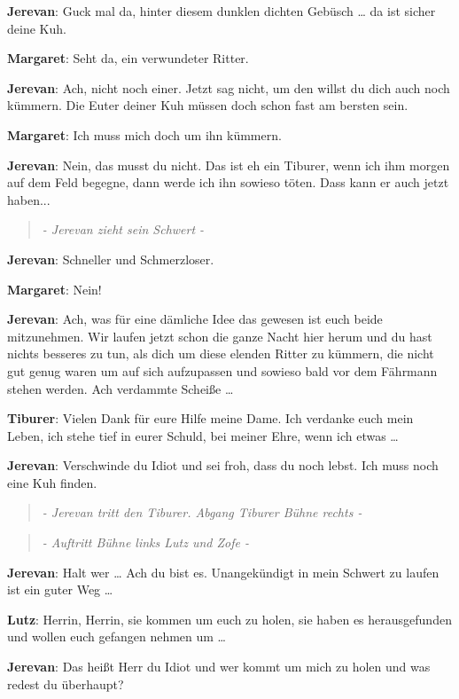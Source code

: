 \documentclass[a5paper,7pt, twocolumn]{book}
\begin{document}
\textbf{Jerevan}: Guck mal da, hinter diesem dunklen dichten Gebüsch … da ist sicher deine Kuh.

\textbf{Margaret}: Seht da, ein verwundeter Ritter.

\textbf{Jerevan}: Ach, nicht noch einer. Jetzt sag nicht, um den willst du dich auch noch kümmern. Die Euter deiner Kuh müssen doch schon fast am bersten sein.

\textbf{Margaret}: Ich muss mich doch um ihn kümmern.

\textbf{Jerevan}: Nein, das musst du nicht. Das ist eh ein Tiburer, wenn ich ihm morgen auf dem Feld begegne, dann werde ich ihn sowieso töten. Dass kann er auch jetzt haben...

\begin{quote}
  \textit{- Jerevan zieht sein Schwert -
}
 \end{quote}


\textbf{Jerevan}: Schneller und Schmerzloser.

\textbf{Margaret}: Nein!

\textbf{Jerevan}: Ach, was für eine dämliche Idee das gewesen ist euch beide mitzunehmen. Wir laufen jetzt schon die ganze Nacht hier herum und du hast nichts besseres zu tun, als dich um diese elenden Ritter zu kümmern, die nicht gut genug waren um auf sich aufzupassen und sowieso bald vor dem Fährmann stehen werden. Ach verdammte Scheiße …

\textbf{Tiburer}: Vielen Dank für eure Hilfe meine Dame. Ich verdanke euch mein Leben, ich stehe tief in eurer Schuld, bei meiner Ehre, wenn ich etwas …

\textbf{Jerevan}: Verschwinde du Idiot und sei froh, dass du noch lebst. Ich muss noch eine Kuh finden.

\begin{quote}
  \textit{- Jerevan tritt den Tiburer. Abgang Tiburer Bühne rechts -
}
 \end{quote}

\begin{quote}
  \textit{- Auftritt Bühne links Lutz und Zofe -
}
 \end{quote}

\textbf{Jerevan}: Halt wer … Ach du bist es. Unangekündigt in mein Schwert zu laufen ist ein guter Weg …

\textbf{Lutz}: Herrin, Herrin, sie kommen um euch zu holen, sie haben es herausgefunden und wollen euch gefangen nehmen um …

\textbf{Jerevan}: Das heißt Herr du Idiot und wer kommt um mich zu holen und was redest du überhaupt?
\end{document}
